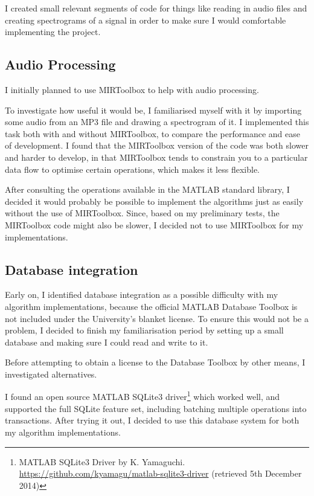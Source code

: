 \documentclass[12pt,a4paper,twoside,openright]{report}
\begin{document}
I created small relevant segments of code for things like reading in audio files and creating spectrograms of a signal in order to make sure I would comfortable implementing the project.

\subsection{Audio Processing}

I initially planned to use MIRToolbox to help with audio processing.

To investigate how useful it would be, I familiarised myself with it by importing some audio from an MP3 file and drawing a spectrogram of it. I implemented this task both with and without MIRToolbox, to compare the performance and ease of development. I found that the MIRToolbox version of the code was both slower and harder to develop, in that MIRToolbox tends to constrain you to a particular data flow to optimise certain operations, which makes it less flexible.

After consulting the operations available in the MATLAB standard library, I decided it would probably be possible to implement the algorithms just as easily without the use of MIRToolbox. Since, based on my preliminary tests, the MIRToolbox code might also be slower, I decided not to use MIRToolbox for my implementations.


\subsection{Database integration}
\label{section:dbaccess}

Early on, I identified database integration as a possible difficulty with my algorithm implementations, because the official MATLAB Database Toolbox is not included under the University's blanket license. To ensure this would not be a problem, I decided to finish my familiarisation period by setting up a small database and making sure I could read and write to it.

Before attempting to obtain a license to the Database Toolbox by other means, I investigated alternatives.

I found an open source MATLAB SQLite3 driver\footnote{MATLAB SQLite3 Driver by K. Yamaguchi. \url{https://github.com/kyamagu/matlab-sqlite3-driver} (retrieved 5th December 2014)} which worked well, and supported the full SQLite feature set, including batching multiple operations into transactions. After trying it out, I decided to use this database system for both my algorithm implementations.
\end{document}
